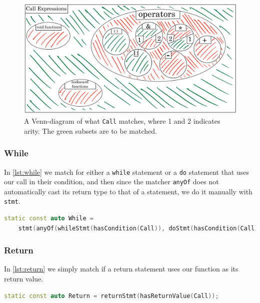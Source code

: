 \begin{figure}[H]
	\includegraphics[width=\linewidth]{images/venn_call.png}
	\caption{A Venn-diagram of what \texttt{Call} matches, where 1 and 2 indicates arity. The green subsets are to be matched.}
	\label{fig:venn-call}
\end{figure}

\subsubsection{While}

In \cref{lst:while} we match
for either a \texttt{while} statement or a \texttt{do} statement that uses our call in their condition, and then since the matcher
\texttt{anyOf} does not automatically cast its return type to that of a statement, we do it manually with \texttt{stmt}.

\begin{lstlisting}[language={C++},caption={The matcher for usage in while expression.},label={lst:while}]
static const auto While =
	stmt(anyOf(whileStmt(hasCondition(Call)), doStmt(hasCondition(Call))));
\end{lstlisting}

\subsubsection{Return}

In \cref{lst:return} we simply match if a return statement uses our function as its return value.

\begin{lstlisting}[language={C++},caption={The matcher for the usage in return statement.},label={lst:return}] 
static const auto Return = returnStmt(hasReturnValue(Call));
\end{lstlisting} %

